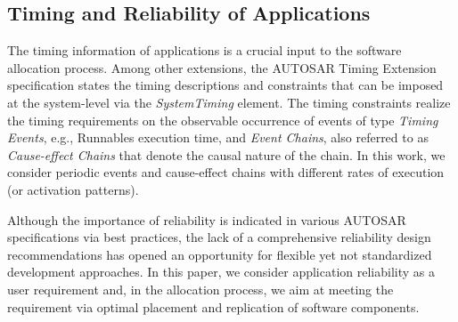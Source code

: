 \subsection{Timing and Reliability of Applications}
The timing information of applications is a crucial input to the software allocation process. Among other extensions, the AUTOSAR Timing Extension specification \cite{AUTOSAR2017SpecificationExtensions} states the timing descriptions and constraints that can be imposed at the system-level via the \textit{SystemTiming} element. The timing constraints realize the timing requirements on the observable occurrence of events of type \textit{Timing Events}, e.g., Runnables execution time, and \textit{Event Chains}, also referred to as \textit{Cause-effect Chains} that denote the causal nature of the chain. In this work, we consider periodic events and cause-effect chains with different rates of execution (or activation patterns).

Although the importance of reliability is indicated in various AUTOSAR specifications via best practices, the lack of a comprehensive reliability design recommendations has opened an opportunity for flexible yet not standardized development approaches. In this paper, we consider application reliability as a user requirement and, in the allocation process, we aim at meeting the requirement via optimal placement and replication of software components.